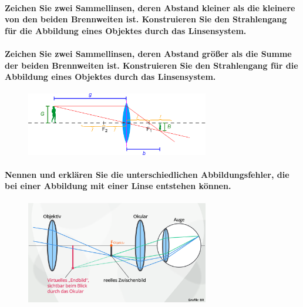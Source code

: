 \documentclass[a4paper, 11pt, ngerman, parskip=half-]{scrartcl}
\begin{document}
\paragraph{Zeichen Sie zwei Sammellinsen, deren Abstand kleiner als die kleinere von den beiden
    Brennweiten ist. Konstruieren Sie den Strahlengang für die Abbildung eines Objektes durch
    das Linsensystem.}

\paragraph{Zeichen Sie zwei Sammellinsen, deren Abstand größer als die Summe der beiden
    Brennweiten ist. Konstruieren Sie den Strahlengang für die Abbildung eines Objektes durch
    das Linsensystem.}

\begin{figure}[H]
    \centering
    \includegraphics[width=8cm]{image/18/geo22}
\end{figure}


\paragraph{Nennen und erklären Sie die unterschiedlichen Abbildungsfehler, die bei einer Abbildung
    mit einer Linse entstehen können.}

\begin{figure}[H]
    \centering
    \includegraphics[width=8cm]{image/18/geo23}
\end{figure}
\end{document}
